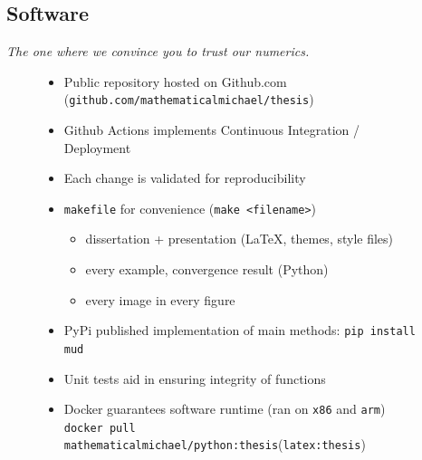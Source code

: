 \subsection{Software}

\begin{frame}[t]{\it The one where we convince you to trust our numerics.}
\centering
\begin{figure}
\centering


\vspace{0.25in}

\begin{itemize}
	\item Public repository hosted on Github.com ({\tt github.com/mathematicalmichael/thesis})
	\item Github Actions implements Continuous Integration / Deployment
	\item Each change is validated for reproducibility
	\item {\tt makefile} for convenience ({\tt make <filename>})
	\begin{itemize}
		\item dissertation + presentation (\LaTeX, themes, style files)
		\item every example, convergence result (Python)
		\item every image in every figure
	\end{itemize}
	\item PyPi published implementation of main methods: {\tt pip install mud}
	\item Unit tests aid in ensuring integrity of functions
	\item Docker guarantees software runtime (ran on {\tt x86} and {\tt arm}) \\ {\tt docker pull mathematicalmichael/python:thesis}({\tt latex:thesis})
\end{itemize}

\end{figure}

\end{frame}
